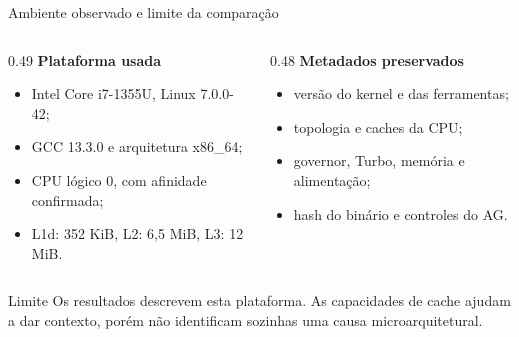 \documentclass[aspectratio=169,11pt]{beamer}
\begin{document}
\begin{frame}{Ambiente observado e limite da comparação}
    \begin{columns}[T,onlytextwidth]
        \begin{column}{0.49\textwidth}
            \textbf{Plataforma usada}
            \begin{itemize}
                \item Intel Core i7-1355U, Linux 7.0.0-42;
                \item GCC 13.3.0 e arquitetura x86\_64;
                \item CPU lógico 0, com afinidade confirmada;
                \item L1d: 352 KiB, L2: 6,5 MiB, L3: 12 MiB.
            \end{itemize}
        \end{column}
        \begin{column}{0.48\textwidth}
            \textbf{Metadados preservados}
            \begin{itemize}
                \item versão do kernel e das ferramentas;
                \item topologia e caches da CPU;
                \item governor, Turbo, memória e alimentação;
                \item hash do binário e controles do AG.
            \end{itemize}
        \end{column}
    \end{columns}
    \vspace{0.22cm}
    \begin{impactbox}{Limite}
        Os resultados descrevem esta plataforma. As capacidades de cache ajudam a dar contexto,
        porém não identificam sozinhas uma causa microarquitetural.
    \end{impactbox}
\end{frame}
\end{document}
